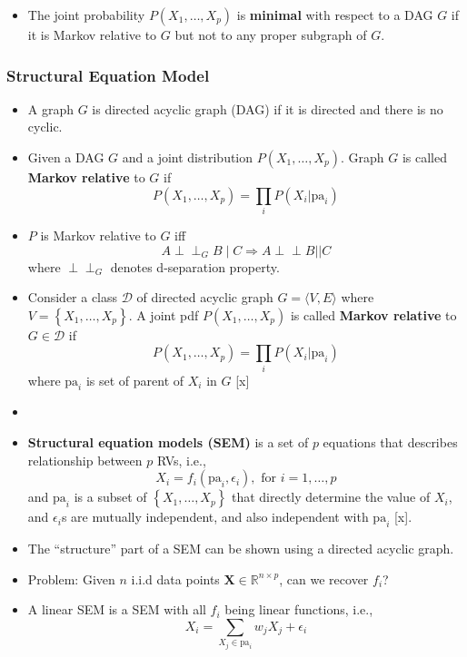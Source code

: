 \documentclass[10pt]{beamer}
\newcommand{\set}[1]{\left\{#1\right\}}
\newcommand{\indep}{\perp \!\!\! \perp}
\begin{document}
\begin{frame}
    \begin{itemize}
        \item The joint probability $P(X_1, \ldots , X_p)$ is \textbf{minimal} with respect to a DAG $G$ if it is Markov relative to $G$ but not to any proper subgraph of $G$.
    \end{itemize}
\end{frame}

\begin{frame}
\frametitle{Structural Equation Model}
\begin{itemize}
    \item A graph $G$ is directed acyclic graph (DAG) if it is directed and there is no cyclic. 
    \item Given a DAG $G$ and a joint distribution  $P(X_1, \ldots , X_p)$. Graph $G$ is called \textbf{Markov relative} to  $G$ if 
                \[
        P(X_1, \ldots , X_p) = \prod_{i} P(X_i | \text{pa}_i)
                \] 
    \item $P$ is Markov relative to  $G$ iff
        \[
        A \indep_{G} B \mid C \Rightarrow A \indep B |\mid C
        \] 
        where $\indep_{G}$ denotes d-separation property.
    \item Consider a class $\mathcal{D}$ of directed acyclic graph $G=\langle V, E \rangle$ where $V=\set{X_1, \ldots , X_p}$.
        A joint pdf $P(X_1, \ldots , X_p)$ is called \textbf{Markov relative} to $G \in \mathcal{D}$ if
        \[
        P(X_1, \ldots , X_p) = \prod_{i} P(X_i | \text{pa}_i)
        \] 
        where $\text{pa}_i$ is set of parent of $X_i$ in $G$ [x]
    \item 

    \item \textbf{Structural equation models (SEM)} is a set of $p$ equations that describes relationship between  $p$ RVs, i.e., 
\[
X_i = f_i(\text{pa}_i, \epsilon_i), \text{ for } i=1, \ldots , p
\]
and $\text{pa}_i$ is a subset of $\set{X_1, \ldots , X_p}$ that directly determine the value of $X_i$, and $\epsilon_i$s are mutually independent, and also independent with $\text{pa}_i$ [x].

\item The ``structure'' part of a SEM can be shown using a directed acyclic graph.

\item Problem: Given $n$ i.i.d data points $\bm{X} \in \mathbb{R}^{n\times  p}$, can we recover $f_i$?
\item A linear SEM is a SEM with all $f_i$ being linear functions, i.e.,
     \[
    X_i = \sum_{X_j \in \text{pa}_i} w_j X_j + \epsilon_i
    \] 
\end{itemize}

\end{frame}
\end{document}
